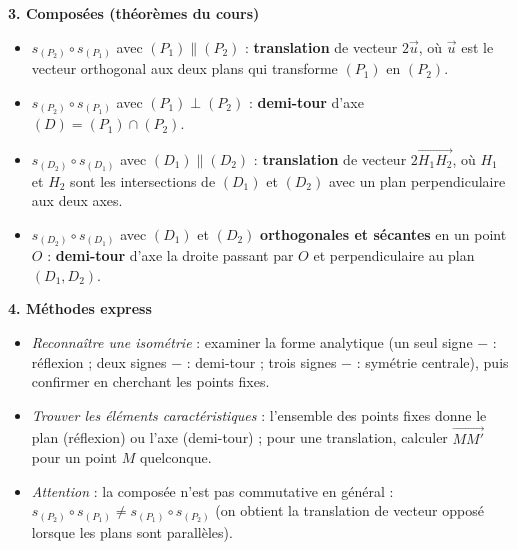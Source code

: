 \documentclass[11pt]{article}
\begin{document}
\begin{aretenir}
\textbf{3. Composées (théorèmes du cours)}
\begin{itemize}
  \item $s_{(P_2)}\circ s_{(P_1)}$ avec $(P_1)\parallel(P_2)$ : \textbf{translation} de vecteur $2\vec{u}$, où $\vec{u}$ est le vecteur orthogonal aux deux plans qui transforme $(P_1)$ en $(P_2)$.
  \item $s_{(P_2)}\circ s_{(P_1)}$ avec $(P_1)\perp(P_2)$ : \textbf{demi-tour} d'axe $(D)=(P_1)\cap(P_2)$.
  \item $s_{(D_2)}\circ s_{(D_1)}$ avec $(D_1)\parallel(D_2)$ : \textbf{translation} de vecteur $2\overrightarrow{H_1H_2}$, où $H_1$ et $H_2$ sont les intersections de $(D_1)$ et $(D_2)$ avec un plan perpendiculaire aux deux axes.
  \item $s_{(D_2)}\circ s_{(D_1)}$ avec $(D_1)$ et $(D_2)$ \textbf{orthogonales et sécantes} en un point $O$ : \textbf{demi-tour} d'axe la droite passant par $O$ et perpendiculaire au plan $(D_1,D_2)$.
\end{itemize}

\textbf{4. Méthodes express}
\begin{itemize}
  \item \emph{Reconnaître une isométrie} : examiner la forme analytique (un seul signe $-$ : réflexion ; deux signes $-$ : demi-tour ; trois signes $-$ : symétrie centrale), puis confirmer en cherchant les points fixes.
  \item \emph{Trouver les éléments caractéristiques} : l'ensemble des points fixes donne le plan (réflexion) ou l'axe (demi-tour) ; pour une translation, calculer $\overrightarrow{MM'}$ pour un point $M$ quelconque.
  \item \emph{Attention} : la composée n'est pas commutative en général : $s_{(P_2)}\circ s_{(P_1)}\neq s_{(P_1)}\circ s_{(P_2)}$ (on obtient la translation de vecteur opposé lorsque les plans sont parallèles).
\end{itemize}
\end{aretenir}
\end{document}
